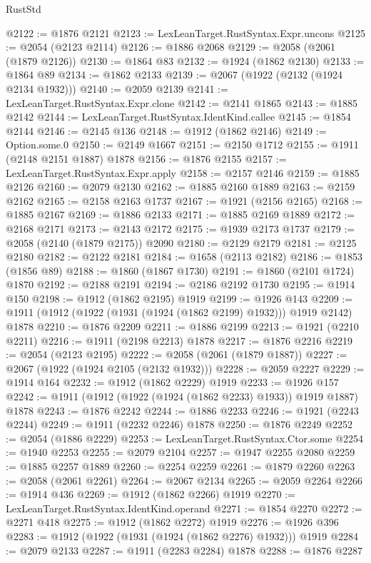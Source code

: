 \begin{lexlean}{RustStd}
\begin{coremodule}
@2122 := @1876 @2121
@2123 := LexLeanTarget.RustSyntax.Expr.uncons
@2125 := @2054 (@2123 @2114)
@2126 := @1886 @2068
@2129 := @2058 (@2061 (@1879 @2126))
@2130 := @1864 @83
@2132 := @1924 (@1862 @2130)
@2133 := @1864 @89
@2134 := @1862 @2133
@2139 := @2067 (@1922 (@2132 (@1924 @2134 @1932)))
@2140 := @2059 @2139
@2141 := LexLeanTarget.RustSyntax.Expr.clone
@2142 := @2141 @1865
@2143 := @1885 @2142
@2144 := LexLeanTarget.RustSyntax.IdentKind.callee
@2145 := @1854 @2144
@2146 := @2145 @136
@2148 := @1912 (@1862 @2146)
@2149 := Option.some.{0}
@2150 := @2149 @1667
@2151 := @2150 @1712
@2155 := @1911 (@2148 @2151 @1887) @1878
@2156 := @1876 @2155
@2157 := LexLeanTarget.RustSyntax.Expr.apply
@2158 := @2157 @2146
@2159 := @1885 @2126
@2160 := @2079 @2130
@2162 := @1885 @2160 @1889
@2163 := @2159 @2162
@2165 := @2158 @2163 @1737
@2167 := @1921 (@2156 @2165)
@2168 := @1885 @2167
@2169 := @1886 @2133
@2171 := @1885 @2169 @1889
@2172 := @2168 @2171
@2173 := @2143 @2172
@2175 := @1939 @2173 @1737
@2179 := @2058 (@2140 (@1879 @2175)) @2090
@2180 := @2129 @2179
@2181 := @2125 @2180
@2182 := @2122 @2181
@2184 := @1658 (@2113 @2182)
@2186 := @1853 (@1856 @89)
@2188 := @1860 (@1867 @1730)
@2191 := @1860 (@2101 @1724) @1870
@2192 := @2188 @2191
@2194 := @2186 @2192 @1730
@2195 := @1914 @150
@2198 := @1912 (@1862 @2195) @1919
@2199 := @1926 @143
@2209 := @1911 (@1912 (@1922 (@1931 (@1924 (@1862 @2199) @1932))) @1919 @2142) @1878
@2210 := @1876 @2209
@2211 := @1886 @2199
@2213 := @1921 (@2210 @2211)
@2216 := @1911 (@2198 @2213) @1878
@2217 := @1876 @2216
@2219 := @2054 (@2123 @2195)
@2222 := @2058 (@2061 (@1879 @1887))
@2227 := @2067 (@1922 (@1924 @2105 (@2132 @1932)))
@2228 := @2059 @2227
@2229 := @1914 @164
@2232 := @1912 (@1862 @2229) @1919
@2233 := @1926 @157
@2242 := @1911 (@1912 (@1922 (@1924 (@1862 @2233) @1933)) @1919 @1887) @1878
@2243 := @1876 @2242
@2244 := @1886 @2233
@2246 := @1921 (@2243 @2244)
@2249 := @1911 (@2232 @2246) @1878
@2250 := @1876 @2249
@2252 := @2054 (@1886 @2229)
@2253 := LexLeanTarget.RustSyntax.Ctor.some
@2254 := @1940 @2253
@2255 := @2079 @2104
@2257 := @1947 @2255 @2080
@2259 := @1885 @2257 @1889
@2260 := @2254 @2259
@2261 := @1879 @2260
@2263 := @2058 (@2061 @2261)
@2264 := @2067 @2134
@2265 := @2059 @2264
@2266 := @1914 @436
@2269 := @1912 (@1862 @2266) @1919
@2270 := LexLeanTarget.RustSyntax.IdentKind.operand
@2271 := @1854 @2270
@2272 := @2271 @418
@2275 := @1912 (@1862 @2272) @1919
@2276 := @1926 @396
@2283 := @1912 (@1922 (@1931 (@1924 (@1862 @2276) @1932))) @1919
@2284 := @2079 @2133
@2287 := @1911 (@2283 @2284) @1878
@2288 := @1876 @2287

\end{coremodule}
\end{lexlean}
